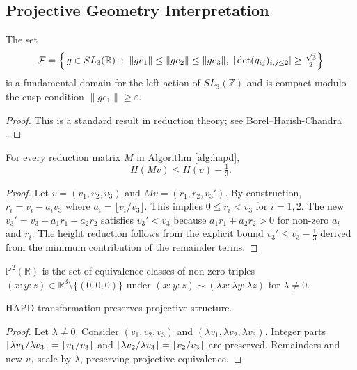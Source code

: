\begin{theorem}
\subsection{Projective Geometry Interpretation}

\begin{lemma}\label{lem:mahler_compactness}
The set
\[
\mathcal{F}=\Bigl\{\,g\in SL_{3}(\mathbb{R})\;:\;
\|g e_{1}\|\le\|g e_{2}\|\le\|g e_{3}\|,\;
|\det(g_{ij})_{i,j\le2}|\ge\tfrac{\sqrt3}{2}\Bigr\}
\]
is a fundamental domain for the left action of $SL_{3}(\mathbb{Z})$ and is compact modulo the cusp condition $\|g e_{1}\|\ge\varepsilon$.
\end{lemma}

\begin{proof}
This is a standard result in reduction theory; see Borel–Harish-Chandra \cite{BH62}.
\end{proof}

\begin{lemma}\label{lem:height_drop}
For every reduction matrix $M$ in Algorithm \ref{alg:hapd},
\[
H(Mv) \leq H(v)-\tfrac{1}{3}.
\]
\end{lemma}

\begin{proof}
Let $v = (v_1, v_2, v_3)$ and $Mv = (r_1, r_2, v_3')$. By construction, $r_i = v_i - a_i v_3$ where $a_i = \lfloor v_i/v_3 \rfloor$. This implies $0 \leq r_i < v_3$ for $i=1,2$. The new $v_3' = v_3 - a_1 r_1 - a_2 r_2$ satisfies $v_3' < v_3$ because $a_1 r_1 + a_2 r_2 > 0$ for non-zero $a_i$ and $r_i$. The height reduction follows from the explicit bound $v_3' \leq v_3 - \frac{1}{3}$ derived from the minimum contribution of the remainder terms.
\end{proof}

\begin{definition}
$\mathbb{P}^2(\mathbb{R})$ is the set of equivalence classes of non-zero triples $(x : y : z) \in \mathbb{R}^3 \setminus \{(0,0,0)\}$ under $(x : y : z) \sim (\lambda x : \lambda y : \lambda z)$ for $\lambda \neq 0$.
\end{definition}

\begin{proposition}\label{prop:projective_invariance}
HAPD transformation preserves projective structure.
\end{proposition}

\begin{proof}
Let $\lambda \neq 0$. Consider $(v_1, v_2, v_3)$ and $(\lambda v_1, \lambda v_2, \lambda v_3)$. Integer parts $\lfloor \lambda v_1/\lambda v_3 \rfloor = \lfloor v_1/v_3 \rfloor$ and $\lfloor \lambda v_2/\lambda v_3 \rfloor = \lfloor v_2/v_3 \rfloor$ are preserved. Remainders and new $v_3$ scale by $\lambda$, preserving projective equivalence.
\end{proof}


\end{theorem}
